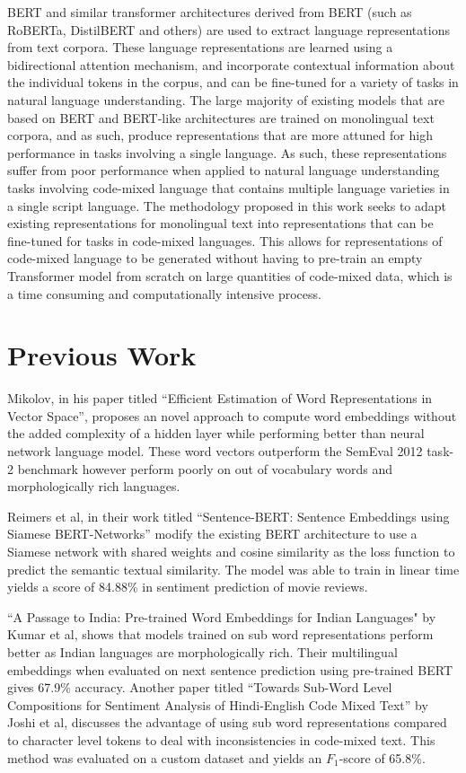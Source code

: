 \documentclass[conference]{IEEEtran}
\begin{document}
BERT\cite{b6} and similar transformer architectures derived from BERT (such as RoBERTa\cite{b7}, DistilBERT\cite{b8} and others) are used to extract language representations from text corpora. These language representations are learned using a bidirectional attention mechanism\cite{b9}, and incorporate contextual information about the individual tokens in the corpus, and can be fine-tuned for a variety of tasks in natural language understanding. The large majority of existing models that are based on BERT and BERT-like architectures are trained on monolingual text corpora, and as such, produce representations that are more attuned for high performance in tasks involving a single language. As such, these representations suffer from poor performance when applied to natural language understanding tasks involving code-mixed language that contains multiple language varieties in a single script language. 
The methodology proposed in this work seeks to adapt existing representations for monolingual text into representations that can be fine-tuned for tasks in code-mixed languages. This allows for representations of code-mixed language to be generated without having to pre-train an empty Transformer model from scratch on large quantities of code-mixed data, which is a time consuming and computationally intensive process. 

\section{Previous Work}

Mikolov, in his paper titled “Efficient Estimation of Word Representations in Vector Space”\cite{b10}, proposes an novel approach to compute word embeddings without the added complexity of a hidden layer while performing better than neural network language model. These word vectors outperform the SemEval 2012 task-2 benchmark however perform poorly on out of vocabulary words and morphologically rich languages. 

Reimers et al, in their work titled “Sentence-BERT: Sentence Embeddings using Siamese BERT-Networks”\cite{b11} modify the existing BERT architecture to use a Siamese network with shared weights and cosine similarity as the loss function to predict the semantic textual similarity. The model was able to train in linear time yields a score of 84.88\% in sentiment prediction of movie reviews. 

“A Passage to India: Pre-trained Word Embeddings for Indian Languages"\cite{b12} by Kumar et al, shows that models trained on sub word representations perform better as Indian languages are morphologically rich. Their multilingual embeddings when evaluated on next sentence prediction using pre-trained BERT gives 67.9\% accuracy. Another paper titled “Towards Sub-Word Level Compositions for Sentiment Analysis of Hindi-English Code Mixed Text”\cite{b13} by Joshi et al, discusses the advantage of using sub word representations compared to character level tokens to deal with inconsistencies in code-mixed text. This method was evaluated on a custom dataset and yields an $F_1$-score of 65.8\%.
\end{document}
